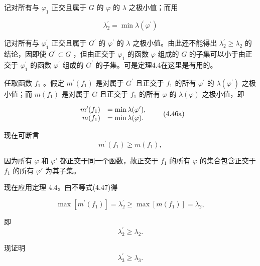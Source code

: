 记对所有与 $\varphi_{1}$ 正交且属于 $G$ 的 $\varphi$ 的 $\lambda$ 之极小值；而用

\begin{equation*}
\lambda_ {2} ^ {\prime} = \min \lambda (\varphi^ {\prime})
\end{equation*}

记对所有与 $\varphi_{1}^{\prime}$ 正交且属于 $G^{\prime}$ 的 $\varphi^{\prime}$ 的 $\lambda$ 之极小值。由此还不能得出 $\lambda_{2}^{\prime} \geqslant \lambda_{2}$ 的结论，因即使 $G^{\prime} \subset G$ ，但由正交于 $\varphi_{1}$ 的函数 $\varphi$ 组成的 $G$ 的子集可以小于由正交于 $\varphi_{1}^{\prime}$ 的函数 $\varphi^{\prime}$ 组成的 $G^{\prime}$ 的子集。可是定理4.4在这里是有用的。

任取函数 $f_{1}$ 。假定 $m^{\prime}(f_{1})$ 是对属于 $G^{\prime}$ 且正交于 $f_{1}$ 的所有 $\varphi^{\prime}$ 的 $\lambda (\varphi^{\prime})$ 之极小值；而 $m(f_{1})$ 是对属于 $G$ 且正交于 $f_{1}$ 的所有 $\varphi$ 的 $\lambda (\varphi)$ 之极小值，即

\begin{equation*}
\begin{array}{r l} m ^ {\prime} (f _ {1}) & = \min \lambda (\varphi^ {\prime}), \\ m (f _ {1}) & = \min \lambda (\varphi). \end{array}\tag{4.46a}
\end{equation*}

现在可断言
\begin{equation*}
m ^ {\prime} (f _ {1}) \geqslant m (f _ {1}),\tag{4.47}
\end{equation*}

因为所有 $\varphi$ 和 $\varphi'$ 都正交于同一个函数，故正交于 $f_{1}$ 的所有 $\varphi$ 的集合包含正交于 $f_{1}$ 的所有 $\varphi'$ 为其子集。

现在应用定理 4.4。由不等式(4.47)得

\begin{equation*}
\max \left[ m ^ {\prime} \left(f _ {1}\right) \right] = \lambda_ {2} ^ {\prime} \geqslant \max \left[ m \left(f _ {1}\right) \right] = \lambda_ {2},
\end{equation*}

即
\begin{equation*}
\lambda_ {2} ^ {\prime} \geqslant \lambda_ {2}.
\end{equation*}

现证明
\begin{equation*}
\lambda_ {3} ^ {\prime} \geqslant \lambda_ {3}.
\end{equation*}

